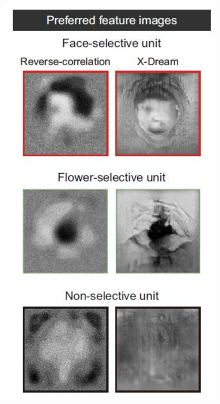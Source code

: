 \documentclass[sn-mathphys]{sn-jnl}%
\theoremstyle{thmstyleone}%
\theoremstyle{thmstyletwo}%
\theoremstyle{thmstylethree}%
\begin{document}
\begin{figure}[htbp]
	\centering
	
	\subfigure%
	{
		\begin{minipage}[t]{0.8\linewidth}
			\centering
			\includegraphics[width=1.0\textwidth]{figs/fig_2_c.pdf}
		\end{minipage}%
	}%
	

\end{figure}
\end{document}
